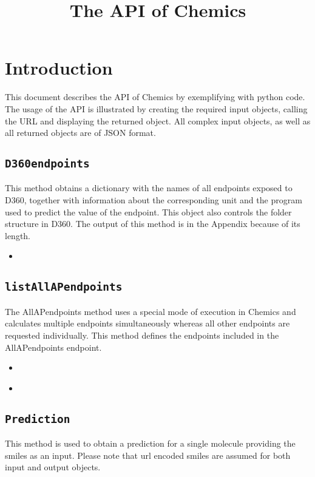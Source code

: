 \documentclass{article}
\title{The API of Chemics}
\newcommand{\insertcode}[2]{\begin{itemize}\item[]\end{itemize}} %
\begin{document}
\maketitle

\section{Introduction}
This document describes the API of Chemics by exemplifying with python code. 
The usage of the API is illustrated by creating the required input objects, calling the URL and displaying the returned object. 
All complex input objects, as well as all returned objects are of JSON format. 

\subsection{\texttt{D360endpoints}}
This method obtains a dictionary with the names of all endpoints exposed to D360, together with information about the corresponding unit and 
the program used to predict the value of the endpoint. This object also controls the folder structure in D360. 
The output of this method is in the Appendix because of its length. 

\insertcode{"Scripts/D360endpoints.py"}{Calling the method returning information about all available endpoints.} %

\subsection{\texttt{listAllAPendpoints}}
The AllAPendpoints method uses a special mode of execution in Chemics and calculates multiple endpoints simultaneously whereas all 
other endpoints are requested individually. This method defines the endpoints included in the AllAPendpoints endpoint. 

\insertcode{"Scripts/listAllAPendpoints.py"}{List all endpoints predicted with the AllAPendpoints method.} %

\insertcode{"Scripts/listAllAPendpoints.txt"}{Output of the \texttt{listAllAPendpoints} method.} %

\subsection{\texttt{Prediction}}
This method is used to obtain a prediction for a single molecule providing the smiles as an input. 
Please note that url encoded smiles are assumed for both input and output objects. 
\end{document}

